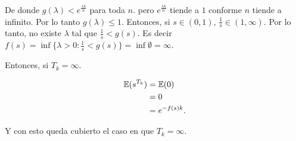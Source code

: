     De donde $g(\lambda) < e^{\frac{\lambda k}{n}}$ para toda $n$. pero $e^{\frac{\lambda k}{n}}$ tiende
    a $1$ conforme $n$ tiende a infinito. Por lo tanto $g(\lambda) \leq 1$. Entonces, si $s \in (0,1)$, 
    $\frac{1}{s} \in (1, \infty)$. Por lo tanto, no existe $\lambda$ tal que $\frac{1}{s} < g(s)$.
    Es decir $f(s) = \inf \{ \lambda > 0 : \frac{1}{s} < g(s)\} = \inf \emptyset = \infty$.\par\null
    
    Entonces, si $T_k = \infty$.
    
    \begin{align}
        \mathbb{E}(s^{T_k})     &= \mathbb{E}(0) \\
                        &= 0     \\
                        &= e^{-f(s) k}.
    \end{align}
    
    Y con esto queda cubierto el caso en que $T_k = \infty$.